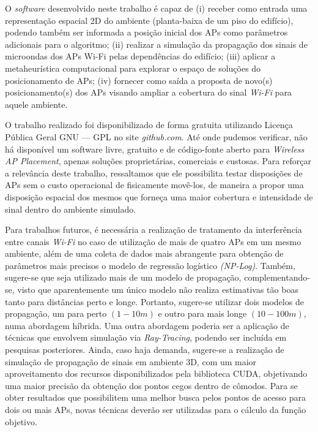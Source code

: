 \documentclass[
	12pt,				%
	twoside,			%
	a4paper,			%
	english,			%
	french,				%
	spanish,			%
	brazil				%
	]{abntex2}
\begin{document}
O \emph{software} desenvolvido neste trabalho é capaz de (i) receber
como entrada uma representação espacial 2D do ambiente (planta-baixa de
um piso do edifício), podendo também ser informada a posição inicial dos
APs como parâmetros adicionais para o algoritmo; (ii) realizar a
simulação da propagação dos sinais de microondas dos APs Wi-Fi pelas
dependências do edifício; (iii) aplicar a metaheurística computacional
para explorar o espaço de soluções do posicionamento de APs; (iv)
fornecer como saída a proposta de novo(s) posicionamento(s) dos APs
visando ampliar a cobertura do sinal \emph{Wi-Fi} para aquele ambiente.

O trabalho realizado foi disponibilizado de forma gratuita utilizando
Licença Pública Geral GNU --- GPL no site \emph{github.com}. Até onde
pudemos verificar, não há disponível um software livre, gratuito e de
código-fonte aberto para \emph{Wireless AP Placement}, apenas soluções
proprietárias, comerciais e custosas. Para reforçar a relevância deste
trabalho, ressaltamos que ele possibilita testar disposições de APs sem
o custo operacional de fisicamente movê-los, de maneira a propor uma
disposição espacial dos mesmos que forneça uma maior cobertura e
intensidade de sinal dentro do ambiente simulado.

Para trabalhos futuros, é necessária a realização de tratamento da
interferência entre canais \emph{Wi-Fi} no caso de utilização de mais de
quatro APs em um mesmo ambiente, além de uma coleta de dados mais
abrangente para obtenção de parâmetros mais precisos o modelo de
regressão logístico \emph{(NP-Log)}. Também, sugere-se que seja
utilizado mais de um modelo de propagação, complementando-se, visto que
aparentemente um único modelo não realiza estimativas tão boas tanto
para distâncias perto e longe. Portanto, sugere-se utilizar dois modelos
de propagação, um para perto \((1-10 m)\) e outro para mais longe
\((10-100 m)\), numa abordagem híbrida. Uma outra abordagem poderia ser
a aplicação de técnicas que envolvem simulação via \emph{Ray-Tracing},
podendo ser incluída em pesquisas posteriores. Ainda, caso haja demanda,
sugere-se a realização de simulação de propagação de sinais em ambiente
3D, com um maior aproveitamento dos recursos disponibilizados pela
biblioteca CUDA, objetivando uma maior precisão da obtenção dos pontos
cegos dentro de cômodos. Para se obter resultados que possibilitem uma
melhor busca pelos pontos de acesso para dois ou mais APs, novas
técnicas deverão ser utilizadas para o cálculo da função objetivo.
\end{document}
